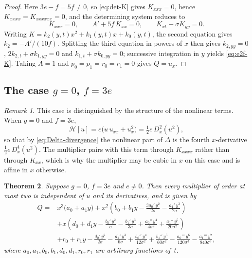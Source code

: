 \documentclass[11pt]{article}
\numberwithin{equation}{section}
\newtheorem{theorem}{Theorem}[section]
\theoremstyle{definition}
\theoremstyle{remark}
\newtheorem{remark}[theorem]{Remark}
\begin{document}
\begin{proof}
Here $3e-f=5f\neq0$, so \eqref{eq:det-K} gives $K_{xxx}=0$, hence
$K_{xxxx}=K_{xxxxxx}=0$, and the determining system reduces to
\begin{equation}
K_{xxx}=0,
\qquad
A' + 5f\,K_{xx} = 0,
\qquad
K_{xt} + \sigma K_{yy} = 0 .
\label{eq:e2f-system}
\end{equation}
Writing $K = k_2(y,t)x^2 + k_1(y,t)x + k_0(y,t)$, the second equation
gives $k_2 = -A'/(10f)$. Splitting the third equation in powers of
$x$ then gives $k_{2,yy}=0$, $2k_{2,t} + \sigma k_{1,yy} = 0$ and
$k_{1,t} + \sigma k_{0,yy} = 0$; successive integration in $y$ yields
\eqref{eq:e2f-K}. Taking $A=1$ and
$p_0=p_1=r_0=r_1=0$ gives $Q=u_x$.
\end{proof}
\subsection{The case \texorpdfstring{$g=0$, $f=3e$}{g=0, f=3e}}
\begin{remark}
\label{rem:f3e-divergence}
This case is distinguished by the structure of the nonlinear terms.
When $g=0$ and $f=3e$,
\begin{equation}
\mathcal{H}[u] = e\bigl(u\,u_{xx} + u_x^2\bigr)
= \tfrac12 e\,D_x^2(u^2),
\label{eq:H-collapse}
\end{equation}
so that by \eqref{eq:Delta-divergence} the nonlinear part of $\Delta$
is the fourth $x$-derivative $\tfrac12 e\,D_x^4(u^2)$. The multiplier
pairs with this term through $K_{xxxx}$ rather than through
$K_{xx}$, which is why the multiplier may be cubic in $x$ on this
case and is affine in $x$ otherwise.
\end{remark}
\begin{theorem}
\label{thm:f-3e}
Suppose $g=0$, $f=3e$ and $e\neq0$. Then every multiplier of order at
most two is independent of $u$ and its derivatives, and is given by
\begin{equation}
\begin{aligned}
Q = {}&
x^3\bigl(a_0 + a_1 y\bigr)
+ x^2\left(
b_0 + b_1 y
- \frac{3a_0'\,y^2}{2\sigma}
- \frac{a_1'\,y^3}{2\sigma}
\right)
\\
&+ x\left(
d_0 + d_1 y
- \frac{b_0'\,y^2}{\sigma}
- \frac{b_1'\,y^3}{3\sigma}
+ \frac{a_0''\,y^4}{4\sigma^2}
+ \frac{a_1''\,y^5}{20\sigma^2}
\right)
\\
&+ r_0 + r_1 y
- \frac{d_0'\,y^2}{2\sigma}
- \frac{d_1'\,y^3}{6\sigma}
+ \frac{b_0''\,y^4}{12\sigma^2}
+ \frac{b_1''\,y^5}{60\sigma^2}
- \frac{a_0'''\,y^6}{120\sigma^3}
- \frac{a_1'''\,y^7}{840\sigma^3},
\end{aligned}
\label{eq:f3e-multiplier}
\end{equation}
where $a_0,a_1,b_0,b_1,d_0,d_1,r_0,r_1$ are arbitrary functions
of~$t$.
\end{theorem}
\end{document}
